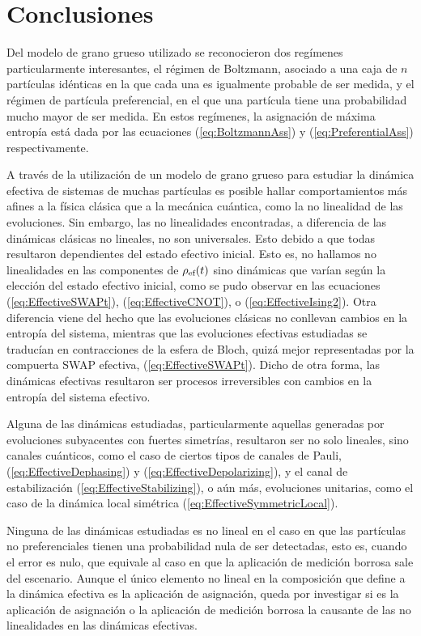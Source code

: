 \chapter{Conclusiones}

Del modelo de grano grueso utilizado se reconocieron dos regímenes particularmente interesantes, el régimen de Boltzmann, asociado a una caja de $n$ partículas idénticas en la que cada una es igualmente probable de ser medida, y el régimen de partícula preferencial, en el que una partícula tiene una probabilidad mucho mayor de ser medida. En estos regímenes, la asignación de máxima entropía está dada por las ecuaciones (\ref{eq:BoltzmannAss}) y (\ref{eq:PreferentialAss}) respectivamente.

A través de la utilización de un modelo de grano grueso para estudiar la dinámica efectiva de sistemas de muchas partículas es posible hallar comportamientos más afines a la física clásica que a la mecánica cuántica, como la no linealidad de las evoluciones. Sin embargo, las no linealidades encontradas, a diferencia de las dinámicas clásicas no lineales, no son universales. Esto debido a que todas resultaron dependientes del estado efectivo inicial. Esto es, no hallamos no linealidades en las componentes de $\rho_{\text{ef}}(t)$ sino dinámicas que varían según la elección del estado efectivo inicial, como se pudo observar en las ecuaciones (\ref{eq:EffectiveSWAPt}), (\ref{eq:EffectiveCNOT}), o (\ref{eq:EffectiveIsing2}). Otra diferencia viene del hecho que las evoluciones clásicas no conllevan cambios en la entropía del sistema, mientras que las evoluciones efectivas estudiadas se traducían en contracciones de la esfera de Bloch, quizá mejor representadas por la compuerta SWAP efectiva, (\ref{eq:EffectiveSWAPt}). Dicho de otra forma, las dinámicas efectivas resultaron ser procesos irreversibles con cambios en la entropía del sistema efectivo.

 Alguna de las dinámicas estudiadas, particularmente aquellas generadas por evoluciones subyacentes con fuertes simetrías, resultaron ser no solo lineales, sino canales cuánticos, como el caso de ciertos tipos de canales de Pauli, (\ref{eq:EffectiveDephasing}) y (\ref{eq:EffectiveDepolarizing}), y el canal de estabilización (\ref{eq:EffectiveStabilizing}), o aún más, evoluciones unitarias, como el caso de la dinámica local simétrica (\ref{eq:EffectiveSymmetricLocal}). 

Ninguna de las dinámicas estudiadas es no lineal en el caso en que las partículas no preferenciales tienen una probabilidad nula de ser detectadas, esto es, cuando el error es nulo, que equivale al caso en que la aplicación de medición borrosa sale del escenario. Aunque el único elemento no lineal en la composición que define a la dinámica efectiva es la aplicación de asignación, queda por investigar si es la aplicación de asignación o la aplicación de medición borrosa la causante de las no linealidades en las dinámicas efectivas.